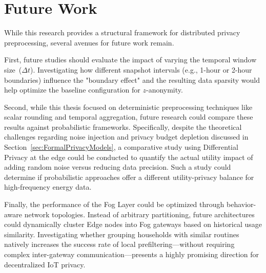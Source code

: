 \section{Future Work}
While this research provides a structural framework for distributed privacy preprocessing, several avenues for future work remain. 

First, future studies should evaluate the impact of varying the temporal window size~($\Delta t$). Investigating how different snapshot intervals (e.g., 1-hour or 2-hour boundaries) influence the "boundary effect" and the resulting data sparsity would help optimize the baseline configuration for $z$-anonymity. 


Second, while this thesis focused on deterministic preprocessing techniques like scalar rounding and temporal aggregation, future research could compare these results against probabilistic frameworks. Specifically, despite the theoretical challenges regarding noise injection and privacy budget depletion discussed in Section~\ref{sec:FormalPrivacyModels}, a comparative study using Differential Privacy at the edge could be conducted to quantify the actual utility impact of adding random noise versus reducing data precision. Such a study could determine if probabilistic approaches offer a different utility-privacy balance for high-frequency energy data.

Finally, the performance of the Fog Layer could be optimized through behavior-aware network topologies. Instead of arbitrary partitioning, future architectures could dynamically cluster Edge nodes into Fog gateways based on historical usage similarity. Investigating whether grouping households with similar routines natively increases the success rate of local prefiltering—without requiring complex inter-gateway communication—presents a highly promising direction for decentralized IoT privacy.